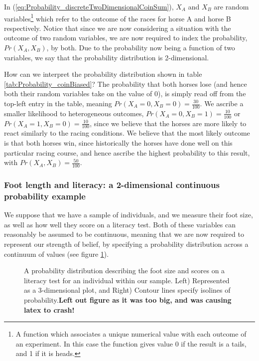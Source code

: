 \documentclass[11pt,fullpage]{book}
\begin{document}
In (\ref{eq:Probability_discreteTwoDimensionalCoinSum}), $X_A$ and $X_B$ are random variables\footnote{A function which associates a unique numerical value with each outcome of an experiment. In this case the function gives value 0 if the result is a tails, and 1 if it is heads.} which refer to the outcome of the races for horse A and horse B respectively. Notice that since we are now considering a situation with the outcome of two random variables, we are now required to index the probability, $Pr(X_A,X_B)$, by both. Due to the probability now being a function of two variables, we say that the probability distribution is 2-dimensional.

How can we interpret the probability distribution shown in table \ref{tab:Probability_coinBiased}? The probability that both horses lose (and hence both their random variables take on the value of 0), is simply read off from the top-left entry in the table, meaning $Pr(X_A=0,X_B=0)=\frac{30}{100}$. We ascribe a smaller likelihood to heterogeneous outcomes, $Pr(X_A=0,X_B=1)=\frac{10}{100}$ or $Pr(X_A=1,X_B=0)=\frac{10}{100}$, since we believe that the horses are more likely to react similarly to the racing conditions. We believe that the most likely outcome is that both horses win, since historically the horses have done well on this particular racing course, and hence ascribe the highest probability to this result, with $Pr(X_A,X_B)=\frac{50}{100}$.

\subsubsection{Foot length and literacy: a 2-dimensional continuous probability example}
We suppose that we have a sample of individuals, and we measure their foot size, as well as how well they score on a literacy test. Both of these variables can reasonably be assumed to be continuous, meaning that we are now required to represent our strength of belief, by specifying a probability distribution across a continuum of values (see figure \ref{fig:Probability_footSizeIntelligenceTwoDimensionalExample}). 

\begin{figure}
\centering
\scalebox{0.5} 
\caption{A probability distribution describing the foot size and scores on a literacy test for an individual within our sample. Left) Represented as a 3-dimensional plot, and Right) Contour lines specify isolines of probability.\textbf{Left out figure as it was too big, and was causing latex to crash!}}\label{fig:Probability_footSizeIntelligenceTwoDimensionalExample}
\end{figure}
\end{document}
